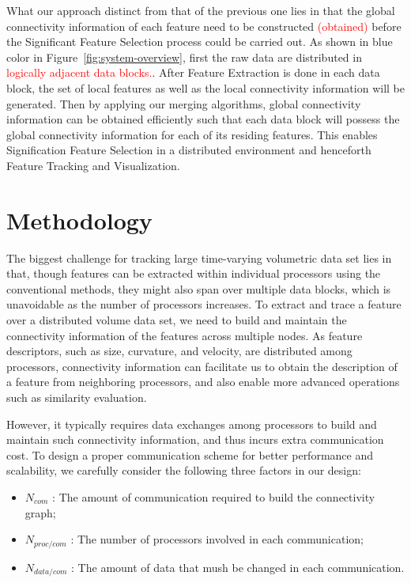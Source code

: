 \documentclass[10pt, conference, compsocconf]{IEEEtran}
\begin{document}
What our approach distinct from that of the previous one lies in that the global connectivity information of each feature need to be constructed \textcolor{red}{(obtained)} before the Significant Feature Selection process could be carried out. As shown in blue color in Figure~\ref{fig:system-overview}, first the raw data are distributed in \textcolor{red}{logically adjacent data blocks.}. After Feature Extraction is done in each data block, the set of local features as well as the local connectivity information will be generated. Then by applying our merging algorithms, global connectivity information can be obtained efficiently such that each data block will possess the global connectivity information for each of its residing features. This enables Signification Feature Selection in a distributed environment and henceforth Feature Tracking and Visualization.

\section{Methodology}
The biggest challenge for tracking large time-varying volumetric data set lies in that, though features can be extracted within individual processors using the conventional methods, they might also span over multiple data blocks, which is unavoidable as the number of processors increases. To extract and trace a feature over a distributed volume data set, we need to build and maintain the connectivity information of the features across multiple nodes. As feature descriptors, such as size, curvature, and velocity, are distributed among processors, connectivity information can facilitate us to obtain the description of a feature from neighboring processors, and also enable more advanced operations such as similarity evaluation.

However, it typically requires data exchanges among processors to build and maintain such connectivity information, and thus incurs extra communication cost. To design a proper communication scheme for better performance and scalability, we carefully consider the following three factors in our design:

\begin{itemize}
	\item $N_{com}$ : The amount of communication required to build the connectivity graph;
	\item $N_{proc/com}$ : The number of processors involved in each communication;
	\item $N_{data/com}$ : The amount of data that mush be changed in each communication.
\end{itemize}
\end{document}
